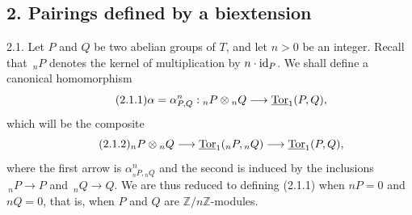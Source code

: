 
\subsection*{2. Pairings defined by a biextension}

2.1. Let $P$ and $Q$ be two abelian groups of $T$, and let $n>0$ be
an integer.  Recall that $\,{}_nP$ denotes the kernel of multiplication
by $n\cdot\mathrm{id}_P$.  We shall define a canonical homomorphism
\begin{equation}\tag{2.1.1}
 \alpha=\alpha^n_{P,Q}:
 {}_nP\otimes{}_nQ\longrightarrow\uTor_1(P,Q),
\end{equation}
which will be the composite
\begin{equation}\tag{2.1.2}
 {}_nP\otimes{}_nQ
 \longrightarrow \uTor_1({}_nP,{}_nQ)
 \longrightarrow \uTor_1(P,Q),
\end{equation}
where the first arrow is $\alpha^n_{{}_nP,{}_nQ}$ and the second is
induced by the inclusions $\,{}_nP\longrightarrow P$ and
$\,{}_nQ\longrightarrow Q$.  We are thus reduced to defining (2.1.1)
when $nP=0$ and $nQ=0$, that is, when $P$ and $Q$ are
$\mathbb Z/n\mathbb Z$-modules.

